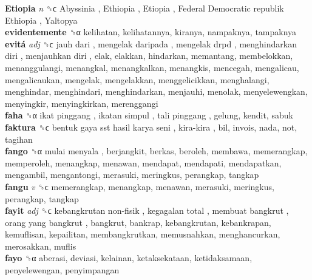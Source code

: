 \textbf{Etiopia} \emph{n}  ␝ϲ   Abyssinia ,  Ethiopia ,  Etiopia ,  Federal Democratic republik Ethiopia ,  Yaltopya   \\
\textbf{evidentemente} ␝α  kelihatan, kelihatannya, kiranya, nampaknya, tampaknya  \\
\textbf{evitá} \emph{adj}  ␝ϲ   jauh dari ,  mengelak daripada ,  mengelak drpd ,  menghindarkan diri ,  menjauhkan diri , elak, elakkan, hindarkan, memantang, membelokkan, menanggulangi, menangkal, menangkalkan, menangkis, mencegah, mengalicau, mengalicaukan, mengelak, mengelakkan, menggelicikkan, menghalangi, menghindar, menghindari, menghindarkan, menjauhi, menolak, menyelewengkan, menyingkir, menyingkirkan, merenggangi  \\
\textbf{faha} ␝α   ikat pinggang ,  ikatan simpul ,  tali pinggang , gelung, kendit, sabuk  \\
\textbf{faktura} ␝ϲ   bentuk gaya sst hasil karya seni ,  kira-kira , bil, invois, nada, not, tagihan  \\
\textbf{fango} ␝α   mulai menyala , berjangkit, berkas, beroleh, membawa, memerangkap, memperoleh, menangkap, menawan, mendapat, mendapati, mendapatkan, mengambil, mengantongi, merasuki, meringkus, perangkap, tangkap  \\
\textbf{fangu} \emph{v}  ␝ϲ  memerangkap, menangkap, menawan, merasuki, meringkus, perangkap, tangkap  \\
\textbf{fayit} \emph{adj}  ␝ϲ   kebangkrutan non-fisik ,  kegagalan total ,  membuat bangkrut ,  orang yang bangkrut , bangkrut, bankrap, kebangkrutan, kebankrapan, kemuflisan, kepailitan, membangkrutkan, memusnahkan, menghancurkan, merosakkan, muflis  \\
\textbf{fayo} ␝α  aberasi, deviasi, kelainan, ketaksekataan, ketidaksamaan, penyelewengan, penyimpangan  \\
